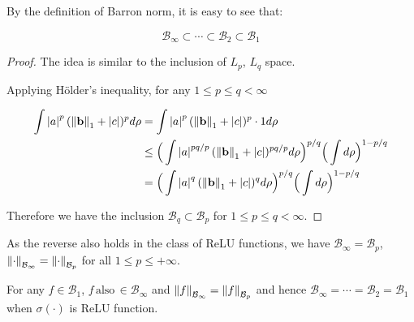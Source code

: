 By the definition of Barron norm, it is easy to see that:

\begin{equation}
    \mathcal{B}_{\infty} \subset \cdots \subset \mathcal{B}_{2} \subset \mathcal{B}_1
\end{equation}


\begin{proof}

The idea is similar to the inclusion of $L_p$, $L_q$ space.

Applying Hölder's inequality, for any $1 \leq p \leq q < \infty$

\begin{align*}
    \int \left| a \right|^p (\left\| \mathbf{b} \right\|_1 + \left| c \right|)^p d\rho
     & = \int \left| a \right|^p (\left\| \mathbf{b} \right\|_1 + \left| c \right|)^p \cdot 1 d\rho                                                    \\
     & \leq \Big(\int \left| a \right|^{pq/p} (\left\| \mathbf{b} \right\|_1 + \left| c \right|)^{pq/p} d\rho \Big)^{p/q} \Big(\int d\rho\Big)^{1-p/q} \\
     & = \Big(\int \left| a \right|^q (\left\| \mathbf{b} \right\|_1 + \left| c \right|)^q d\rho \Big)^{p/q} \Big(\int d\rho\Big)^{1-p/q}
\end{align*}

Therefore we have the inclusion $\mathcal{B}_{q} \subset \mathcal{B}_p$ for $1
    \leq p \leq q < \infty$. 
\end{proof}

As the reverse also holds in the class of ReLU functions,  we have
$\mathcal{B}_{\infty} = \mathcal{B}_p$, $\left\lVert\cdot\right\rVert_{\mathcal{B}_\infty} =
    \left\lVert\cdot\right\rVert_{\mathcal{B}_p}$  for all $1 \leq p \leq +\infty$.

\begin{lemma}\label{lamma:equivalence_barron_space}

    For any $f \in \mathcal{B}_1$, $f
        \,\text{also}\, \in \mathcal{B}_{\infty}$ and $\left\lVert f\right\rVert_{\mathcal{B}_\infty} =
        \left\lVert f\right\rVert_{\mathcal{B}_p}$ and hence $ \mathcal{B}_{\infty} = \cdots =
        \mathcal{B}_{2} = \mathcal{B}_1$ when $\sigma(\cdot)$ is ReLU function.
\end{lemma}

